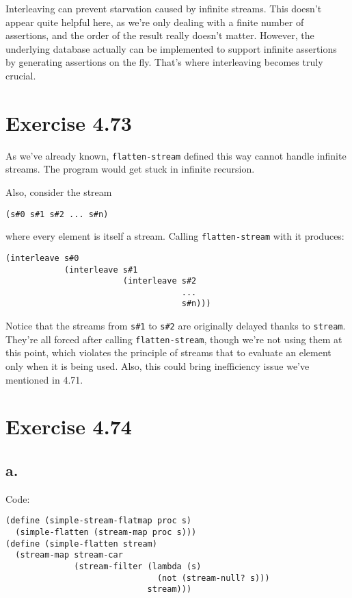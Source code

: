 \documentclass[../main.tex]{subfiles}
\begin{document}
Interleaving can prevent starvation caused by infinite streams. This doesn't appear quite helpful here, as we're only dealing with a finite number of assertions, and the order of the result really doesn't matter. However, the underlying database actually can be implemented to support infinite assertions by generating assertions on the fly. That's where interleaving becomes truly crucial.

\section{Exercise 4.73}

As we've already known, \lstinline{flatten-stream} defined this way cannot handle infinite streams. The program would get stuck in infinite recursion.

Also, consider the stream

\begin{lstlisting}
(s#0 s#1 s#2 ... s#n)
\end{lstlisting}

where every element is itself a stream. Calling \lstinline{flatten-stream} with it produces:

\begin{lstlisting}
(interleave s#0
            (interleave s#1
                        (interleave s#2
                                    ...
                                    s#n)))
\end{lstlisting}

Notice that the streams from \lstinline{s#1} to \lstinline{s#2} are originally delayed thanks to \lstinline{stream}. They're all forced after calling \lstinline{flatten-stream}, though we're not using them at this point, which violates the principle of streams that to evaluate an element only when it is being used. Also, this could bring inefficiency issue we've mentioned in 4.71.

\section{Exercise 4.74}

\subsection{a.}

Code:

\begin{lstlisting}
(define (simple-stream-flatmap proc s)
  (simple-flatten (stream-map proc s)))
(define (simple-flatten stream)
  (stream-map stream-car
              (stream-filter (lambda (s)
                               (not (stream-null? s)))
                             stream)))
\end{lstlisting}
\end{document}
